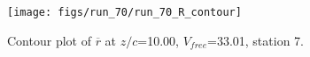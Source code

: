 \begin{figure}[H]
\centering
\texttt{[image: figs/run\_70/run\_70\_R\_contour]}
\caption{Contour plot of $\overline{r}$ at $z/c$=10.00, $V_{free}$=33.01, station 7.}
\end{figure}


